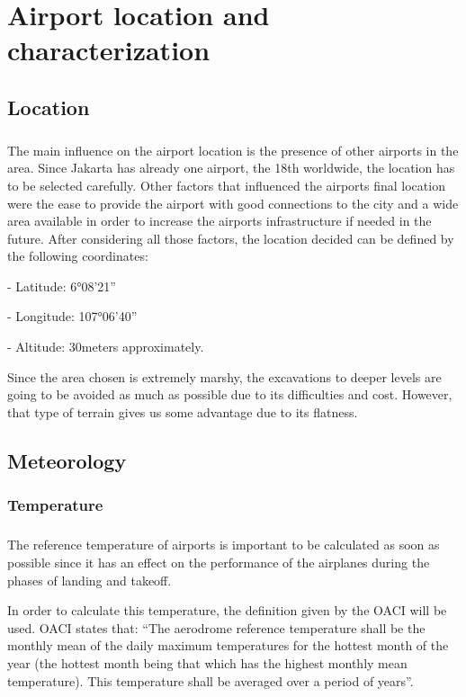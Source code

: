 \chapter{Airport location and characterization}
	\section{Location}
\paragraph{} The main influence on the airport location is the presence of other airports in the area. Since
Jakarta has already one airport, the 18th worldwide, the location has to be selected carefully.
Other factors that influenced the airports final location were the ease to provide the airport
with good connections to the city and a wide area available in order to increase the airports
infrastructure if needed in the future.
After considering all those factors, the location decided can be defined by the following coordinates:

- Latitude: 6°08'21''

- Longitude: 107°06'40''

- Altitude: 30meters approximately.

Since the area chosen is extremely marshy, the excavations to deeper levels are going to be
avoided as much as possible due to its difficulties and cost. However, that type of terrain gives
us some advantage due to its flatness.
	\section{Meteorology}
		\subsection{Temperature}
		\paragraph{}The reference temperature of airports is important to be calculated as soon as possible since it has an effect on the performance of the airplanes during the phases of landing and takeoff. 
		
		In order to calculate this temperature, the definition given by the OACI will be used. OACI states that: “The aerodrome reference temperature shall be the monthly mean of the daily maximum temperatures for the hottest month of the year (the hottest month being that which has the highest monthly mean temperature). This temperature shall be averaged over a period of years”.
		
